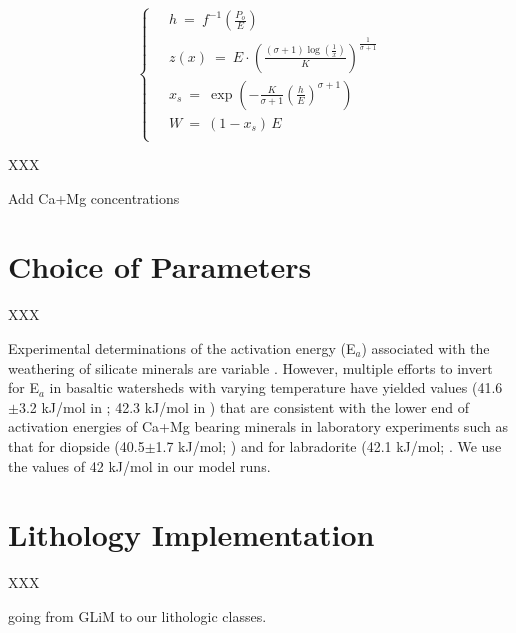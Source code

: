 \documentclass[11pt,letterpaper]{article}
\begin{document}
\begin{equation}\label{eq:dynsoil_ss}
\left\{\ 
\begin{aligned}
& h        \ =\   f^{-1}\left( \frac{P_o}{E} \right)                                                 \\
& z(x)     \ =\   E \cdot\! \left( \frac{ (\sigma+1) \log(\frac{1}{x}) }{ K } \right) ^ \frac{1}{\sigma+1}                                                                  \\
& x_s      \ =\   \exp\left(   - \frac{K}{\sigma+1}  \left(\frac{h}{E}\right)^{\sigma+1}   \right)   \\
& W        \ =\   (1-x_s) \, E                                                                           \\
\end{aligned}
\right.
\end{equation}


XXX

Add Ca+Mg concentrations

\section*{Choice of Parameters}

XXX

Experimental determinations of the activation energy (E$_a$) associated with the weathering of silicate minerals are variable \citep{Brantley2003a}. However, multiple efforts to invert for E$_a$ in basaltic watersheds with varying temperature have yielded values (41.6$\pm$3.2 kJ/mol in \citealp{Li2016a}; 42.3 kJ/mol in \citealp{Dessert2001a}) that are consistent with the lower end of activation energies of Ca+Mg bearing minerals in laboratory experiments such as that for diopside (40.5$\pm$1.7 kJ/mol; \citealp{Knauss1993a}) and for labradorite (42.1 kJ/mol; \citealp{Carroll2005a}. We use the values of 42 kJ/mol in our model runs.

\section*{Lithology Implementation}

XXX

going from GLiM to our lithologic classes.

\clearpage

\singlespacing

\newpage



\end{document}
